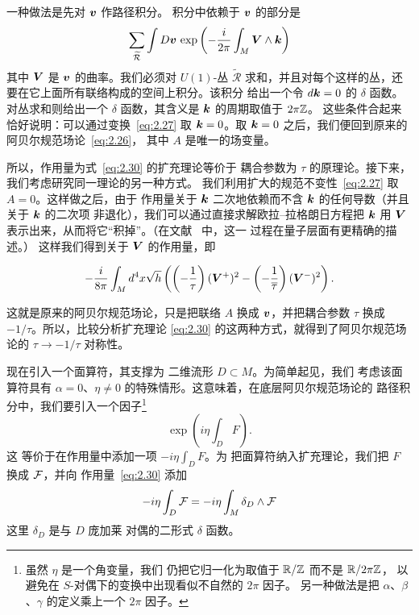 一种做法是先对 $\bm{v}$ 作路径积分。
积分中依赖于 $\bm{v}$ 的部分是
\setcounter{equation}{30}
\begin{equation}\label{eq:2.31}
  \sum_{\widetilde{\mathcal R}}\int
D\bm{v}\,\exp\left(-{i\over 2\pi}\int_M \bm{V}\wedge \bm{k}\right)
\end{equation}
 其中
$\bm{V}$ 是 $\bm{v}$ 的曲率。我们必须对 $U(1)$-丛
$\tilde{\mathcal R}$ 求和，并且对每个这样的丛，还要在它上面所有联络构成的空间上积分。该积分
给出一个令 $d\bm{k}=0$ 的 $\delta$ 函数。对丛求和则给出一个 $\delta$
函数，其含义是 $\bm{k}$ 的周期取值于 $2\pi{\mathbb{Z}}$。
这些条件合起来恰好说明：可以通过变换~\eqref{eq:2.27} 取 $\bm{k}=0$。取
$\bm{k}=0$ 之后，我们便回到原来的阿贝尔规范场论~\eqref{eq:2.26}，
其中 $A$ 是唯一的场变量。

所以，作用量为式~\eqref{eq:2.30} 的扩充理论等价于
耦合参数为 $\tau$ 的原理论。接下来，我们考虑研究同一理论的另一种方式。
我们利用扩大的规范不变性~\eqref{eq:2.27} 取 $A=0$。这样做之后，由于
作用量关于 $\bm{k}$ 二次地依赖而不含 $\bm{k}$ 的任何导数（并且关于 $\bm{k}$ 的二次项
非退化），我们可以通过直接求解欧拉–拉格朗日方程把 $\bm{k}$ 用 $\bm{V}$ 表示出来，从而将它“积掉”。（在文献~\cite{ref43} 中，这一
过程在量子层面有更精确的描述。）
这样我们得到关于 $\bm{V}$ 的作用量，即

\setcounter{equation}{31}
\begin{equation}\label{eq:2.32}
  -{i\over 8\pi}\int_Md^4x\sqrt
h\left(\left(-{1\over\tau}\right)(\bm{V}^+)^2-\left(-{1\over\overline\tau}\right)(\bm{V}^-)^2\right).
\end{equation}

这就是原来的阿贝尔规范场论，只是把联络
$A$ 换成 $\bm{v}$，并把耦合参数 $\tau$ 换成
$-1/\tau$。所以，比较分析扩充理论
\eqref{eq:2.30} 的这两种方式，就得到了阿贝尔规范场论的
$\tau\to -1/\tau$ 对称性。

现在引入一个面算符，其支撑为
二维流形 $D\subset M$。为简单起见，我们
考虑该面算符具有
$\alpha=0$、$\eta\not=0$ 的特殊情形。这意味着，在底层阿贝尔规范场论的
路径积分中，我们要引入一个因子\footnote{虽然 $\eta$ 是一个角变量，我们
仍把它归一化为取值于 ${\mathbb{R}}/{\mathbb{Z}}$ 而不是 ${\mathbb{R}}/2\pi{\mathbb{Z}}$，
以避免在 $S$-对偶下的变换中出现看似不自然的 $2\pi$ 因子。
另一种做法是把
$\alpha$、$\beta$、$\gamma$ 的定义乘上一个 $2\pi$ 因子。}
\setcounter{equation}{32}
\begin{equation}\label{eq:2.33}
  \exp\left(i\eta\int_D{F}\right).
\end{equation}
 这
等价于在作用量中添加一项 $-i\eta\int_DF$。为
把面算符纳入扩充理论，我们把 $F$ 换成 ${\mathcal F}$，并向
作用量~\eqref{eq:2.30} 添加
\setcounter{equation}{33}
\begin{equation}\label{eq:2.34}
  -i\eta\int_D
{{\mathcal F}}=-i\eta\int_M \delta_D\wedge {{\mathcal F}}
\end{equation}
 这里 $\delta_D$ 是与 $D$ 庞加莱
对偶的二形式 $\delta$ 函数。


